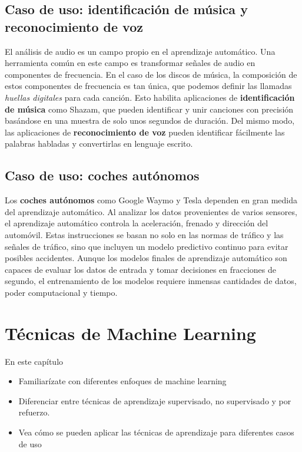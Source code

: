 \documentclass[
]{book}
\providecommand{\tightlist}{%
  \setlength{\itemsep}{0pt}\setlength{\parskip}{0pt}}
\begin{document}
\hypertarget{caso-de-uso-identificaciuxf3n-de-muxfasica-y-reconocimiento-de-voz}{%
\subsection{Caso de uso: identificación de música y reconocimiento de voz}\label{caso-de-uso-identificaciuxf3n-de-muxfasica-y-reconocimiento-de-voz}}

El análisis de audio es un campo propio en el aprendizaje automático. Una herramienta común en este campo es transformar señales de audio en componentes de frecuencia. En el caso de los discos de música, la composición de estos componentes de frecuencia es tan única, que podemos definir las llamadas \emph{huellas digitales} para cada canción. Esto habilita aplicaciones de \textbf{identificación de música} como Shazam, que pueden identificar y unir canciones con precisión basándose en una muestra de solo unos segundos de duración. Del mismo modo, las aplicaciones de \textbf{reconocimiento de voz} pueden identificar fácilmente las palabras habladas y convertirlas en lenguaje escrito.

\hypertarget{caso-de-uso-coches-autuxf3nomos}{%
\subsection{Caso de uso: coches autónomos}\label{caso-de-uso-coches-autuxf3nomos}}

Los \textbf{coches autónomos} como Google Waymo y Tesla dependen en gran medida del aprendizaje automático. Al analizar los datos provenientes de varios sensores, el aprendizaje automático controla la aceleración, frenado y dirección del automóvil. Estas instrucciones se basan no solo en las normas de tráfico y las señales de tráfico, sino que incluyen un modelo predictivo continuo para evitar posibles accidentes. Aunque los modelos finales de aprendizaje automático son capaces de evaluar los datos de entrada y tomar decisiones en fracciones de segundo, el entrenamiento de los modelos requiere inmensas cantidades de datos, poder computacional y tiempo.

\hypertarget{tuxe9cnicas-de-machine-learning}{%
\section{Técnicas de Machine Learning}\label{tuxe9cnicas-de-machine-learning}}

En este capítulo

\begin{itemize}
\tightlist
\item
  Familiarízate con diferentes enfoques de machine learning
\item
  Diferenciar entre técnicas de aprendizaje supervisado, no supervisado y por refuerzo.
\item
  Vea cómo se pueden aplicar las técnicas de aprendizaje para diferentes casos de uso
\end{itemize}
\end{document}
